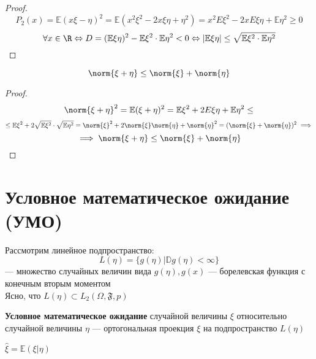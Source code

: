 \begin{proof}
    \[ P_2(x) = \mathbb{\mathbb{E}}(x\xi - \eta)^2 = \mathbb{E}(x^2\xi^2 - 2x\xi\eta + \eta^2) = x^2E\xi^2 - 2xE\xi\eta + \mathbb{E}\eta^2 \ge 0 \]
    \[ \forall x \in \R \Leftrightarrow D = (\mathbb{E}\xi\eta)^2 - \mathbb{E}\xi^2\cdot \mathbb{E}\eta^2 < 0 \Leftrightarrow |\mathbb{E}\xi\eta| \le \sqrt{\mathbb{E}\xi^2\cdot \mathbb{E}\eta^2} \]
\end{proof}
\begin{corollary}
    \[ \norm{\xi + \eta} \le \norm{\xi} + \norm{\eta} \]
\end{corollary}
\begin{proof}
    \[ \norm{\xi + \eta}^2 = \mathbb{E}(\xi + \eta)^2 = \mathbb{E}\xi^2 + 2E\xi\eta + \mathbb{E}\eta^2 \le \]
    \[ \le \mathbb{E}\xi^2 + 2\sqrt{\mathbb{E}\xi^2}\cdot\sqrt{\mathbb{E}\eta^2} = \norm{\xi}^2 + 2\norm{\xi}\norm{\eta} + \norm{\eta}^2 = (\norm{\xi} + \norm{\eta})^2 \implies \]
    \[ \implies \norm{\xi + \eta} \le \norm{\xi} + \norm{\eta} \]
\end{proof}

\section{Условное математическое ожидание (УМО)}
Рассмотрим линейное подпространство:
\[ L(\eta) = \{g(\eta) \big| \mathbb{D}g(\eta) < \infty\} \]
--- множество случайных величин вида \(g(\eta), g(x)\) --- борелевская функция с конечным вторым моментом \\
Ясно, что \(L(\eta) \subset L_2(\Omega,\mathfrak{F}, p)\)
\begin{definition}
    \textbf{Условное математическое ожидание} случайной величины \(\xi\) относительно случайной величины \(\eta\) --- ортогональная проекция \(\xi\) на подпространство \(L(\eta)\)
\end{definition}
\begin{obozn}
    \(\hat{\xi} = \mathbb{E}(\xi | \eta)\)
\end{obozn}

